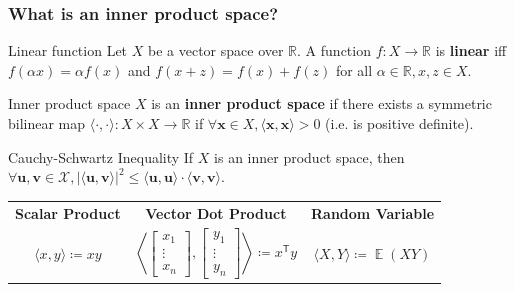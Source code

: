 \documentclass{beamer}
\begin{document}
    \begin{frame}
        \frametitle{What is an inner product space?}

        \begin{block}{Linear function}
            Let $X$ be a vector space over $\mathbb R$. A function $f: X \rightarrow \mathbb R$ is \textbf{linear} iff $f(\alpha x)= \alpha f(x)$
            and $f(x+z)=f(x)+f(z)$ for all $\alpha\in\mathbb R, x,z \in X$.
        \end{block}

        \begin{block}{Inner product space}
            $X$ is an \textbf{inner product space} if there exists a symmetric bilinear map $\langle \cdot ,\cdot \rangle :X\times X\to \mathbb R$ if $\forall \mathbf x \in X, \langle \mathbf x,\mathbf x \rangle > 0$ (i.e. is positive definite).
        \end{block}
        \begin{block}{Cauchy-Schwartz Inequality}
            If $X$ is an inner product space, then $\forall \mathbf u, \mathbf v \in \mathcal X, |\langle\mathbf u, \mathbf v\rangle|^2 \leq \langle \mathbf u, \mathbf u\rangle\cdot\langle\mathbf v, \mathbf v\rangle$.
        \end{block}
        \begin{center}
            \begin{tabular}{ c c c }
                \textbf{Scalar Product} & \textbf{Vector Dot Product} & \textbf{Random Variable} \\
                $\langle x,y\rangle \coloneqq xy$ &
                $\left\langle {\begin{bmatrix}
                                   x_{1}\\\vdots \\x_{n}
                \end{bmatrix}},{\begin{bmatrix}
                                    y_{1}\\\vdots \\y_{n}
                \end{bmatrix}}\right\rangle \coloneqq x^{\textsf {T}}y$ &
                $\langle X,Y\rangle \coloneqq \operatorname {\mathbb E} (XY)$
            \end{tabular}
        \end{center}
    \end{frame}
\end{document}
